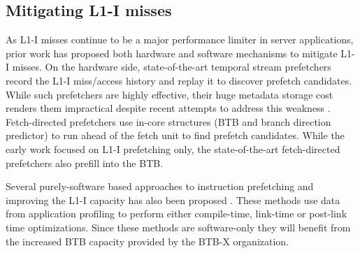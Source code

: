 
\subsection{Mitigating L1-I misses}
As L1-I misses continue to be a major performance limiter in server applications\cite{profileWarehouse, jukebox, wosc}, prior work has proposed both hardware and software mechanisms to mitigate L1-I misses. On the hardware side, state-of-the-art temporal stream prefetchers \cite{tifs, pif} record the L1-I miss/access history and replay it to discover prefetch candidates. While such prefetchers are highly effective, their huge metadata storage cost renders them impractical despite recent attempts to address this weakness \cite{shift, confluence}. Fetch-directed prefetchers use in-core structures (BTB and branch direction predictor) to run ahead of the fetch unit to find prefetch candidates. While the early work \cite{fdip} focused on L1-I prefetching only, the state-of-the-art fetch-directed prefetchers \cite{boomerang, shotgun} also prefill into the BTB.


Several purely-software based approaches to instruction prefetching and improving the L1-I capacity has also been proposed \cite{chen2016autofdo, li2010lightweight, ottoni2017optimizing, luk2004ispike, panchenko2019bolt, luk1998cooperative, annavaram2003call, ayers2019asmdb, khan2020spy}. These methods use data from application profiling to perform either compile-time, link-time or post-link time optimizations. Since these methods are software-only they will benefit from the increased BTB capacity provided by the BTB-X organization. %
